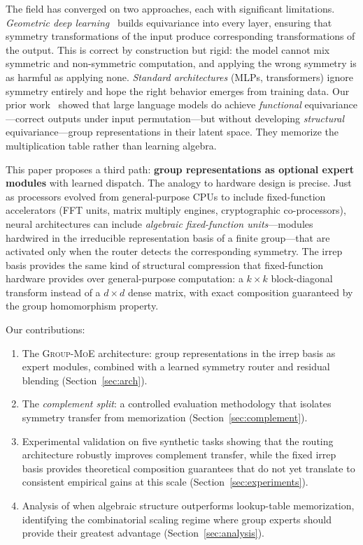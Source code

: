 \documentclass[10pt, letterpaper]{article}
\newcommand{\gmoe}{\textsc{Group-MoE}}
\begin{document}
The field has converged on two approaches, each with significant limitations. \emph{Geometric deep learning}~\cite{bronstein2021geometric, cohen2016group} builds equivariance into every layer, ensuring that symmetry transformations of the input produce corresponding transformations of the output. This is correct by construction but rigid: the model cannot mix symmetric and non-symmetric computation, and applying the wrong symmetry is as harmful as applying none. \emph{Standard architectures} (MLPs, transformers) ignore symmetry entirely and hope the right behavior emerges from training data. Our prior work~\cite{walters2025ordering} showed that large language models do achieve \emph{functional} equivariance---correct outputs under input permutation---but without developing \emph{structural} equivariance---group representations in their latent space. They memorize the multiplication table rather than learning algebra.

This paper proposes a third path: \textbf{group representations as optional expert modules} with learned dispatch. The analogy to hardware design is precise. Just as processors evolved from general-purpose CPUs to include fixed-function accelerators (FFT units, matrix multiply engines, cryptographic co-processors), neural architectures can include \emph{algebraic fixed-function units}---modules hardwired in the irreducible representation basis of a finite group---that are activated only when the router detects the corresponding symmetry. The irrep basis provides the same kind of structural compression that fixed-function hardware provides over general-purpose computation: a $k \times k$ block-diagonal transform instead of a $d \times d$ dense matrix, with exact composition guaranteed by the group homomorphism property.

Our contributions:
\begin{enumerate}[leftmargin=*]
    \item The \gmoe{} architecture: group representations in the irrep basis as expert modules, combined with a learned symmetry router and residual blending (Section~\ref{sec:arch}).
    \item The \emph{complement split}: a controlled evaluation methodology that isolates symmetry transfer from memorization (Section~\ref{sec:complement}).
    \item Experimental validation on five synthetic tasks showing that the routing architecture robustly improves complement transfer, while the fixed irrep basis provides theoretical composition guarantees that do not yet translate to consistent empirical gains at this scale (Section~\ref{sec:experiments}).
    \item Analysis of when algebraic structure outperforms lookup-table memorization, identifying the combinatorial scaling regime where group experts should provide their greatest advantage (Section~\ref{sec:analysis}).
\end{enumerate}
\end{document}
